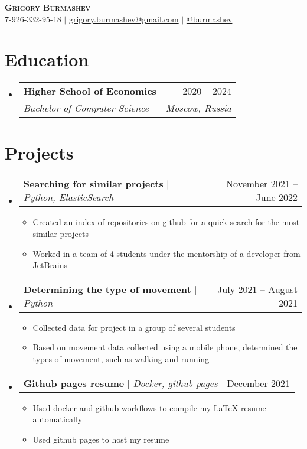 \documentclass[letterpaper,11pt]{article}
\makeatletter
\newcommand{\resumeItem}[1]{
  \item\small{
    {#1 \vspace{-2pt}}
  }
}
\newcommand{\resumeSubheading}[4]{
  \vspace{-2pt}\item
    \begin{tabular*}{0.97\textwidth}[t]{l@{\extracolsep{\fill}}r}
      \textbf{#1} & #2 \\
      \textit{\small#3} & \textit{\small #4} \\
    \end{tabular*}\vspace{-7pt}
}
\newcommand{\resumeProjectHeading}[2]{
    \item
    \begin{tabular*}{0.97\textwidth}{l@{\extracolsep{\fill}}r}
      \small#1 & #2 \\
    \end{tabular*}\vspace{-7pt}
}
\newcommand{\resumeSubHeadingListStart}{\begin{itemize}[leftmargin=0.15in, label={}]}
\newcommand{\resumeSubHeadingListEnd}{\end{itemize}}
\newcommand{\resumeItemListStart}{\begin{itemize}}
\newcommand{\resumeItemListEnd}{\end{itemize}\vspace{-5pt}}
\makeatother
\begin{document}


\begin{center}
    \textbf{\Huge \scshape Grigory Burmashev} \\ \vspace{1pt}
    \small 7-926-332-95-18 $|$ \href{mailto:x@xcom}{grigory.burmashev@gmail.com} $|$ 
    \href{https://github.com/x}{@burmashev}
\end{center}


\section{Education}
  \resumeSubHeadingListStart
    \resumeSubheading
      {Higher School of Economics}{2020 -- 2024}
      {Bachelor of Computer Science}{Moscow, Russia}
  \resumeSubHeadingListEnd

\section{Projects}

    \resumeSubHeadingListStart
      \resumeProjectHeading
          {\textbf{Searching for similar projects} $|$ \emph{Python, ElasticSearch}}{November 2021 -- June 2022}
          \resumeItemListStart
            \resumeItem{Created an index of repositories on github for a quick search for the most similar projects}\\
			\resumeItem{Worked in a team of 4 students under the mentorship of a developer from JetBrains}
          \resumeItemListEnd

       \resumeProjectHeading
          {\textbf{Determining the type of movement} $|$ \emph{Python}}{July 2021 -- August 2021}
          \resumeItemListStart
			\resumeItem{Collected data for project in a group of several students}
            \resumeItem{Based on movement data collected using a mobile phone, determined the types of movement, such as walking and running}
          \resumeItemListEnd
    
			\resumeProjectHeading
          {\textbf{Github pages resume} $|$ \emph{Docker, github pages}}{December 2021}
          \resumeItemListStart
			\resumeItem{Used docker and github workflows to compile my LaTeX resume automatically}
      		\resumeItem{Used github pages to host my resume}
          \resumeItemListEnd
    \resumeSubHeadingListEnd


%

\end{document}
